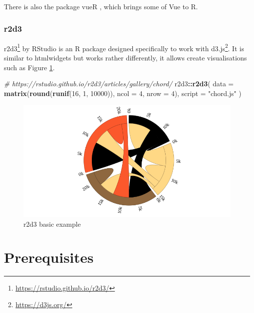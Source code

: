 \documentclass[10pt,]{krantz}
\makeatletter
\newenvironment{Shaded}{\begin{snugshade}}{\end{snugshade}}
\newcommand{\CommentTok}[1]{\textcolor[rgb]{0.37,0.37,0.37}{\textit{#1}}}
\newcommand{\DataTypeTok}[1]{\textcolor[rgb]{0.27,0.27,0.27}{#1}}
\newcommand{\DecValTok}[1]{\textcolor[rgb]{0.06,0.06,0.06}{#1}}
\newcommand{\KeywordTok}[1]{\textcolor[rgb]{0.27,0.27,0.27}{\textbf{#1}}}
\newcommand{\NormalTok}[1]{#1}
\newcommand{\OperatorTok}[1]{\textcolor[rgb]{0.43,0.43,0.43}{\textbf{#1}}}
\newcommand{\StringTok}[1]{\textcolor[rgb]{0.5,0.5,0.5}{#1}}
\renewcommand{\href}[2]{#2\footnote{\url{#1}}}
\newenvironment{kframe}{%
\medskip{}
\setlength{\fboxsep}{.8em}
 \def\at@end@of@kframe{}%
 \ifinner\ifhmode%
  \def\at@end@of@kframe{\end{minipage}}%
  \begin{minipage}{\columnwidth}%
 \fi\fi%
 \def\FrameCommand##1{\hskip\@totalleftmargin \hskip-\fboxsep
 \colorbox{shadecolor}{##1}\hskip-\fboxsep
     \hskip-\linewidth \hskip-\@totalleftmargin \hskip\columnwidth}%
 \MakeFramed {\advance\hsize-\width
   \@totalleftmargin\z@ \linewidth\hsize
   \@setminipage}}%
 {\par\unskip\endMakeFramed%
 \at@end@of@kframe}
\renewenvironment{Shaded}{\begin{kframe}}{\end{kframe}}
\makeatother
\begin{document}
There is also the package vueR \citep{R-vueR}, which brings some of Vue to R.

\hypertarget{intro-r2d3}{%
\subsection{r2d3}\label{intro-r2d3}}

\href{https://rstudio.github.io/r2d3/}{r2d3} \citep{R-r2d3} by RStudio is an R package designed specifically to work with \href{https://d3js.org/}{d3.js}. It is similar to htmlwidgets but works rather differently, it allows create visualisations such as Figure \ref{fig:r2d3}.

\begin{Shaded}
\begin{Highlighting}[]
\CommentTok{# https://rstudio.github.io/r2d3/articles/gallery/chord/}
\NormalTok{r2d3}\OperatorTok{::}\KeywordTok{r2d3}\NormalTok{(}
  \DataTypeTok{data =} \KeywordTok{matrix}\NormalTok{(}\KeywordTok{round}\NormalTok{(}\KeywordTok{runif}\NormalTok{(}\DecValTok{16}\NormalTok{, }\DecValTok{1}\NormalTok{, }\DecValTok{10000}\NormalTok{)), }\DataTypeTok{ncol =} \DecValTok{4}\NormalTok{, }\DataTypeTok{nrow =} \DecValTok{4}\NormalTok{), }
  \DataTypeTok{script =} \StringTok{"chord.js"}
\NormalTok{)}
\end{Highlighting}
\end{Shaded}

\begin{figure}[H]

{\centering \includegraphics[width=1\linewidth]{images/01-d3} 

}

\caption{r2d3 basic example}\label{fig:r2d3}
\end{figure}

\hypertarget{prerequisites}{%
\chapter{Prerequisites}\label{prerequisites}}
\end{document}
